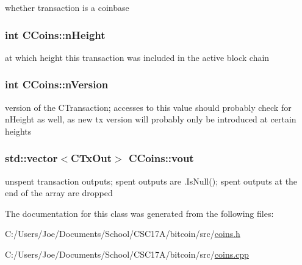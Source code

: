 whether transaction is a coinbase 

\hypertarget{class_c_coins_af7396dfad71367de46f21cf92e2c70ab}{}
\subsubsection[{n\+Height}]{\setlength{\rightskip}{0pt plus 5cm}int C\+Coins\+::n\+Height}\label{class_c_coins_af7396dfad71367de46f21cf92e2c70ab}


at which height this transaction was included in the active block chain 

\hypertarget{class_c_coins_a96fea4ee8841e9ce32f60c2e7e3cf6b6}{}
\subsubsection[{n\+Version}]{\setlength{\rightskip}{0pt plus 5cm}int C\+Coins\+::n\+Version}\label{class_c_coins_a96fea4ee8841e9ce32f60c2e7e3cf6b6}
version of the C\+Transaction; accesses to this value should probably check for n\+Height as well, as new tx version will probably only be introduced at certain heights \hypertarget{class_c_coins_a1dcea1a6da9b25642337e286f9f59b03}{}
\subsubsection[{vout}]{\setlength{\rightskip}{0pt plus 5cm}std\+::vector$<$C\+Tx\+Out$>$ C\+Coins\+::vout}\label{class_c_coins_a1dcea1a6da9b25642337e286f9f59b03}


unspent transaction outputs; spent outputs are .Is\+Null(); spent outputs at the end of the array are dropped 



The documentation for this class was generated from the following files\+:\begin{DoxyCompactItemize}
\item 
C\+:/\+Users/\+Joe/\+Documents/\+School/\+C\+S\+C17\+A/bitcoin/src/\hyperlink{coins_8h}{coins.\+h}\item 
C\+:/\+Users/\+Joe/\+Documents/\+School/\+C\+S\+C17\+A/bitcoin/src/\hyperlink{coins_8cpp}{coins.\+cpp}\end{DoxyCompactItemize}
